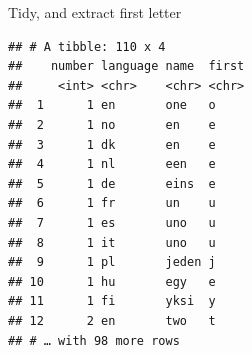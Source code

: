 \documentclass[ignorenonframetext,]{beamer}
\newenvironment{Shaded}{\begin{snugshade}}{\end{snugshade}}
\newcommand{\DataTypeTok}[1]{\textcolor[rgb]{0.13,0.29,0.53}{#1}}
\newcommand{\DecValTok}[1]{\textcolor[rgb]{0.00,0.00,0.81}{#1}}
\newcommand{\KeywordTok}[1]{\textcolor[rgb]{0.13,0.29,0.53}{\textbf{#1}}}
\newcommand{\NormalTok}[1]{#1}
\newcommand{\OperatorTok}[1]{\textcolor[rgb]{0.81,0.36,0.00}{\textbf{#1}}}
\newcommand{\StringTok}[1]{\textcolor[rgb]{0.31,0.60,0.02}{#1}}
\begin{document}
\begin{frame}[fragile]{Tidy, and extract first letter}
\protect\hypertarget{tidy-and-extract-first-letter}{}

\footnotesize

\begin{Shaded}
\end{Shaded}

\begin{verbatim}
## # A tibble: 110 x 4
##    number language name  first
##     <int> <chr>    <chr> <chr>
##  1      1 en       one   o    
##  2      1 no       en    e    
##  3      1 dk       en    e    
##  4      1 nl       een   e    
##  5      1 de       eins  e    
##  6      1 fr       un    u    
##  7      1 es       uno   u    
##  8      1 it       uno   u    
##  9      1 pl       jeden j    
## 10      1 hu       egy   e    
## 11      1 fi       yksi  y    
## 12      2 en       two   t    
## # … with 98 more rows
\end{verbatim}

\normalsize

\end{frame}
\end{document}
